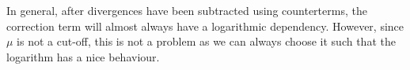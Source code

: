 In general, after divergences have been subtracted using counterterms, the correction term will almost always have a logarithmic dependency. However, since $\mu$ is not a cut-off, this is not a problem as we can always choose it such that the logarithm has a nice behaviour. 


